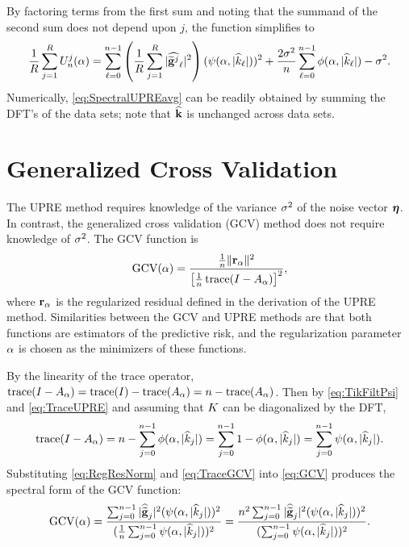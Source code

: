 By factoring terms from the first sum and noting that the summand of the second sum does not depend upon $j$, the function simplifies to
\begin{equation}
\frac{1}{R}\sum_{j=1}^R U_n^j(\alpha) =  \sum_{\ell = 0}^{n-1} \left(\frac{1}{R}\sum_{j=1}^R |\widehat{\widetilde{\mathbf{g}}^j}_\ell|^2\right)(\psi(\alpha,|\widehat{k}_\ell|))^2 + \frac{2\sigma^2}{n}\sum_{\ell = 0}^{n-1} \phi(\alpha,|\widehat{k}_\ell|) - \sigma^2.
\label{eq:SpectralUPREavg}
\end{equation}
Numerically, \eqref{eq:SpectralUPREavg} can be readily obtained by summing the DFT's of the data sets; note that $\widehat{\mathbf{k}}$ is unchanged across data sets.

\section{Generalized Cross Validation} \label{sec:Generalized Cross Validation}
The UPRE method requires knowledge of the variance $\sigma^2$ of the noise vector $\boldsymbol{\eta}$. In contrast, the generalized cross validation (GCV) method \cite{Wahba1977,Wahba1990} does not require knowledge of $\sigma^2$. The GCV function is
\begin{equation}
\label{eq:GCV}
\text{GCV}(\alpha) = \frac{\frac{1}{n}\|\mathbf{r}_{\alpha}\|^2}{\left[\frac{1}{n}\operatorname{trace}(I-A_{\alpha})\right]^2},
\end{equation}
where $\mathbf{r}_{\alpha}$ is the regularized residual defined in the derivation of the UPRE method. Similarities between the GCV and UPRE methods are that both functions are estimators of the predictive risk, and the regularization parameter $\alpha$ is chosen as the minimizers of these functions. \par 
By the linearity of the trace operator, $\operatorname{trace}(I-A_{\alpha}) = \operatorname{trace}(I)-\operatorname{trace}(A_{\alpha}) = n - \operatorname{trace}(A_{\alpha})$. Then by \eqref{eq:TikFiltPsi} and \eqref{eq:TraceUPRE} and assuming that $K$ can be diagonalized by the DFT,
\begin{equation}
\operatorname{trace}(I-A_{\alpha}) = n - \sum_{j = 0}^{n-1} \phi(\alpha,|\widehat{k}_j|) = \sum_{j = 0}^{n-1} 1 - \phi(\alpha,|\widehat{k}_j|) = \sum_{j = 0}^{n-1} \psi(\alpha,|\widehat{k}_j|).
\label{eq:TraceGCV}
\end{equation}
Substituting \eqref{eq:RegResNorm} and \eqref{eq:TraceGCV} into \eqref{eq:GCV} produces the spectral form of the GCV function:
\begin{equation}
\text{GCV}(\alpha) = \frac{\sum_{j = 0}^{n-1} |\widehat{\widetilde{\mathbf{g}}}_j|^2(\psi(\alpha,|\widehat{k}_j|))^2}{(\frac{1}{n}\sum_{j = 0}^{n-1} \psi(\alpha,|\widehat{k}_j|))^2} = \frac{n^2\sum_{j = 0}^{n-1} |\widehat{\widetilde{\mathbf{g}}}_j|^2(\psi(\alpha,|\widehat{k}_j|))^2}{(\sum_{j = 0}^{n-1} \psi(\alpha,|\widehat{k}_j|))^2}.
\label{eq:SpectralGCV}
\end{equation}
